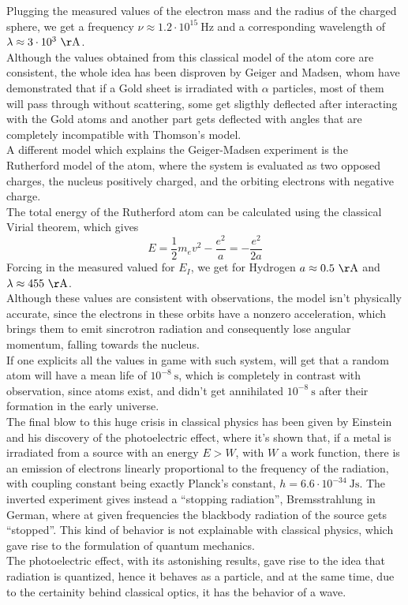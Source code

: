 \documentclass[a4paper, 11pt]{book}
\newcommand{\1}{\opr{\mathds{1}}}
\newcommand{\unit}[1]{\ \mathrm{#1}}
\theoremstyle{plain}
\begin{document}
	Plugging the measured values of the electron mass and the radius of the charged sphere, we get a frequency $\nu\approx1.2\cdot10^{15}\unit{Hz}$ and a corresponding wavelength of $\lambda\approx3\cdot10^3\unit{\AA}$.\\
	Although the values obtained from this classical model of the atom core are consistent, the whole idea has been disproven by Geiger and Madsen, whom have demonstrated that if a Gold sheet is irradiated with $\alpha$ particles, most of them will pass through without scattering, some get sligthly deflected after interacting with the Gold atoms and another part gets deflected with angles that are completely incompatible with Thomson's model.\\
	A different model which explains the Geiger-Madsen experiment is the Rutherford model of the atom, where the system is evaluated as two opposed charges, the nucleus positively charged, and the orbiting electrons with negative charge.\\
	The total energy of the Rutherford atom can be calculated using the classical Virial theorem, which gives
	\begin{equation}
		E=\frac{1}{2}m_ev^2-\frac{e^2}{a}=-\frac{e^2}{2a}
		\label{eq:rutherfordenergy}
	\end{equation}
	Forcing in the measured valued for $E_I$, we get for Hydrogen $a\approx0.5\unit{\AA}$ and $\lambda\approx455\unit{\AA}$.\\
	Although these values are consistent with observations, the model isn't physically accurate, since the electrons in these orbits have a nonzero acceleration, which brings them to emit sincrotron radiation and consequently lose angular momentum, falling towards the nucleus.\\
	If one explicits all the values in game with such system, will get that a random atom will have a mean life of $10^{-8}\unit{s}$, which is completely in contrast with observation, since atoms exist, and didn't get annihilated $10^{-8}\unit{s}$ after their formation in the early universe.\\
	The final blow to this huge crisis in classical physics has been given by Einstein and his discovery of the photoelectric effect, where it's shown that, if a metal is irradiated from a source with an energy $E>W$, with $W$ a work function, there is an emission of electrons linearly proportional to the frequency of the radiation, with coupling constant being exactly Planck's constant, $h=6.6\cdot10^{-34}\unit{Js}$. The inverted experiment gives instead a ``stopping radiation'', Bremsstrahlung in German, where at given frequencies the blackbody radiation of the source gets ``stopped''. This kind of behavior is not explainable with classical physics, which gave rise to the formulation of quantum mechanics.\\
	The photoelectric effect, with its astonishing results, gave rise to the idea that radiation is quantized, hence it behaves as a particle, and at the same time, due to the certainity behind classical optics, it has the behavior of a wave.
\end{document}
